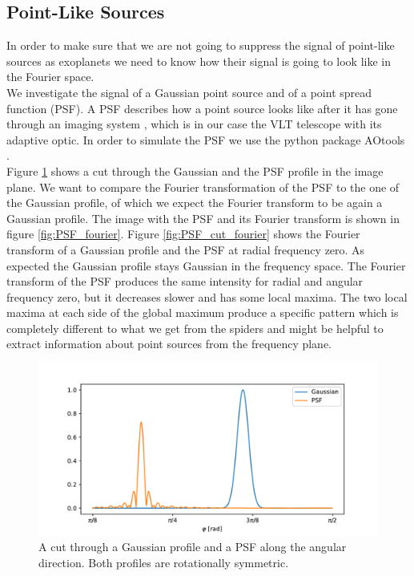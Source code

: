\subsection{Point-Like Sources}
\label{sec:pointlike}
In order to make sure that we are not going to suppress the signal of point-like sources as exoplanets we need to know how their signal is going to look like in the Fourier space.\\
We investigate the signal of a Gaussian point source and of a point spread function (PSF). A PSF describes how a point source looks like after it has gone through an imaging system \cite{PSFwiki}, which is in our case the VLT telescope with its adaptive optic. In order to simulate the PSF we use the python package AOtools \cite{AOtools}.\\
Figure \ref{fig:PSF_cut_image} shows a cut through the Gaussian and the PSF profile in the image plane. We want to compare the Fourier transformation of the PSF to the one of the Gaussian profile, of which we expect the Fourier transform to be again a Gaussian profile. The image with the PSF and its Fourier transform is shown in figure \ref{fig:PSF_fourier}. Figure \ref{fig:PSF_cut_fourier} shows the Fourier transform of a Gaussian profile and the PSF at radial frequency zero. As expected the Gaussian profile stays Gaussian in the frequency space. The Fourier transform of the PSF produces the same intensity for radial and angular frequency zero, but it decreases slower and has some local maxima. The two local maxima at each side of the global maximum produce a specific pattern which is completely different to what we get from the spiders and might be helpful to extract information about point sources from the frequency plane.  
\begin{figure}[H]
	\centering
		\includegraphics[width=1.0\textwidth]{pics/PSF_cut_image.pdf}
		\caption{A cut through a Gaussian profile and a PSF along the angular direction. Both profiles are rotationally symmetric.}
		\label{fig:PSF_cut_image}
\end{figure}
